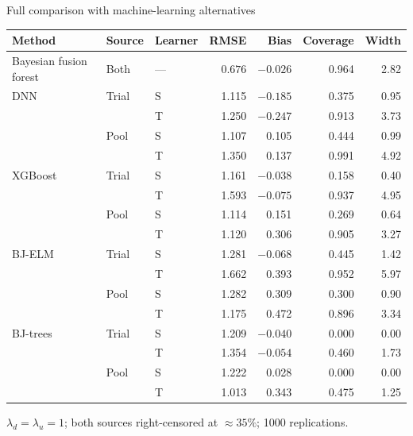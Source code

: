 \documentclass[10pt,aspectratio=169]{beamer}
\begin{document}
\begin{frame}{Full comparison with machine-learning alternatives}
\centering
\scriptsize
\renewcommand{\arraystretch}{0.85}
\begin{tabular}{@{}lll rrrr@{}}
\toprule
Method & Source & Learner & RMSE & Bias & Coverage & Width \\
\midrule
Bayesian fusion forest & Both & --- & $\mathbf{0.676}$ & $\mathbf{-0.026}$ & 0.964 & 2.82 \\
\midrule
DNN     & Trial & S & 1.115 & $-0.185$ & 0.375 & 0.95 \\
        &       & T & 1.250 & $-0.247$ & 0.913 & 3.73 \\
        & Pool  & S & 1.107 & 0.105 & 0.444 & 0.99 \\
        &       & T & 1.350 & 0.137 & 0.991 & 4.92 \\
\addlinespace
XGBoost & Trial & S & 1.161 & $-0.038$ & 0.158 & 0.40 \\
        &       & T & 1.593 & $-0.075$ & 0.937 & 4.95 \\
        & Pool  & S & 1.114 & 0.151 & 0.269 & 0.64 \\
        &       & T & 1.120 & 0.306 & 0.905 & 3.27 \\
\addlinespace
BJ-ELM  & Trial & S & 1.281 & $-0.068$ & 0.445 & 1.42 \\
        &       & T & 1.662 & 0.393 & 0.952 & 5.97 \\
        & Pool  & S & 1.282 & 0.309 & 0.300 & 0.90 \\
        &       & T & 1.175 & 0.472 & 0.896 & 3.34 \\
\addlinespace
BJ-trees& Trial & S & 1.209 & $-0.040$ & 0.000 & 0.00 \\
        &       & T & 1.354 & $-0.054$ & 0.460 & 1.73 \\
        & Pool  & S & 1.222 & 0.028 & 0.000 & 0.00 \\
        &       & T & 1.013 & 0.343 & 0.475 & 1.25 \\
\bottomrule
\end{tabular}

\vspace{0.3cm}
{\scriptsize $\lambda_d = \lambda_u = 1$; both sources right-censored at
$\approx 35\%$; 1000 replications.}
\end{frame}
\end{document}
